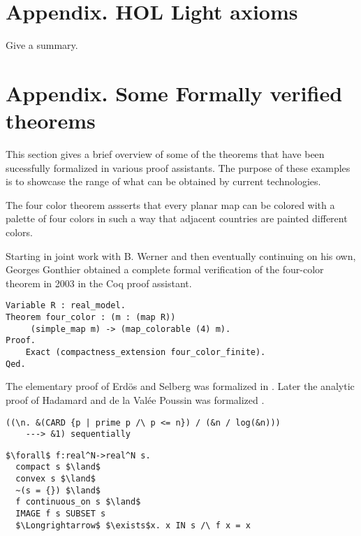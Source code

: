 \documentclass[brochure,english,12pt]{bourbaki}
\theoremstyle{plain}
\begin{document}
\section{Appendix. HOL Light axioms}

Give a summary.


\section{Appendix. Some Formally verified theorems}


This section gives a brief overview of some of the theorems that have been sucessfully formalized
in various proof assistants.  The purpose of these examples is to showcase the range
of what can be obtained by current technologies.


The four color theorem assserts that every planar map can be colored with a palette of four colors in such a way that adjacent
countries are painted different colors.

Starting in joint work with B. Werner and then eventually continuing on his own,
Georges Gonthier obtained a complete formal verification of the four-color theorem in 2003 in
the Coq proof assistant.

\begin{lstlisting}[keepspaces=true,stringstyle=\tt,basicstyle=\small,frame=single,framesep=8pt,morekeywords={Variable,Theorem,Proof,Qed},columns=flexible,caption={Four-color theorem in Coq}]
Variable R : real_model. 
Theorem four_color : (m : (map R))
     (simple_map m) -> (map_colorable (4) m). 
Proof.
    Exact (compactness_extension four_color_finite). 
Qed.
\end{lstlisting}


The elementary proof of Erd\"os and Selberg was formalized in \cite{XX}.  Later the analytic proof of Hadamard and de la Val\'ee Poussin
was formalized \cite{XX}.

\begin{lstlisting}[keepspaces=true,stringstyle=\tt,basicstyle=\small,frame=single,framesep=8pt,mathescape,morekeywords={theorem,fixes,assumes,defines,shows,Variable,Theorem,Proof,Qed},columns=flexible,caption={The prime number theorem}]
  ((\n. &(CARD {p | prime p /\ p <= n}) / (&n / log(&n)))
    ---> &1) sequentially
\end{lstlisting}

\begin{lstlisting}[keepspaces=true,stringstyle=\tt,basicstyle=\small,frame=single,framesep=8pt,mathescape,morekeywords={theorem,fixes,assumes,defines,shows,Variable,Theorem,Proof,Qed},columns=flexible,caption={Brouwer fixed point formula}]
  $\forall$ f:real^N->real^N s. 
  compact s $\land$ 
  convex s $\land$
  ~(s = {}) $\land$
  f continuous_on s $\land$
  IMAGE f s SUBSET s
  $\Longrightarrow$ $\exists$x. x IN s /\ f x = x
\end{lstlisting}
\end{document}
